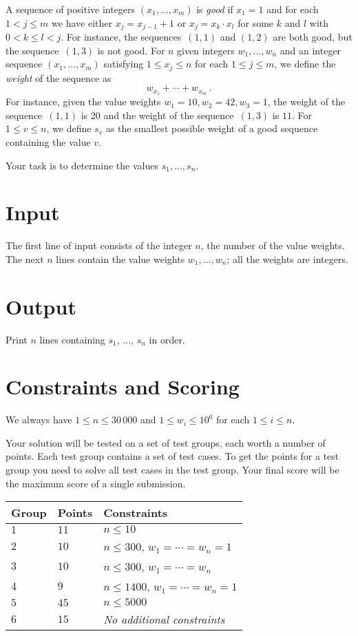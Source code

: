
\noindent
A sequence of positive integers $(x_1,\ldots,x_m)$ is \emph{good} if  $x_1 = 1$ and for each $1 < j \leq m$ we have either $x_j=x_{j-1}+1$ or $x_j=x_k\cdot x_l$ for some $k$ and $l$ with $0< k\leq l< j$.
For instance, the sequences~$(1,1)$ and $(1,2)$ are both good, but the sequence~$(1,3)$ is not good.
For  $n$ given integers $w_1,\ldots,w_n$
and an integer sequence $(x_1,\ldots,x_m)$ satisfying $1\leq x_j \leq n$ for each $1\leq j\leq m$, 
we define the \emph{weight} of the sequence as
\[ w_{x_1} +\cdots +w_{x_m}\,.\] 
For instance, given the value weights $w_1=10,  w_2=42,w_3= 1$, the weight of the sequence~$(1,1)$ is $20$ and the weight of the sequence~$(1,3)$ is $11$.
For $1\leq v\leq n$, we define $s_v$ as the smallest possible weight of a good sequence containing the value $v$.

Your task is to determine the values $s_1,\ldots ,s_n$.

\section*{Input}

The first line of input consists of the integer $n$, the number of the value weights.
The next $n$ lines contain the value weights $w_1, \ldots, w_n$; all the weights are integers.

\section*{Output}

Print $n$ lines containing $s_1$, $\ldots$, $s_n$ in order.

\section*{Constraints and Scoring}

We always have
$1\leq n \leq 30\,000$ %
and
$1\leq w_i \leq 10^6$ for each $1\leq i \leq n$.%

Your solution will be tested on a set of test groups, each worth a number of points.
Each test group contains a set of test cases.
To get the points for a test group you need to solve all test cases in the test group.
Your final score will be the maximum score of a single submission.

\medskip
\begin{tabular}{lll}
Group & Points & Constraints \\\hline
$1$   & $11$ & $n\leq 10$ \\
$2$   & $10$ & $n\leq 300$, $w_1=\cdots=w_n = 1$ \\
$3$   & $10$ & $n\leq 300$, $w_1=\cdots=w_n$ \\ %
$4$   & $9$ & $n\leq 1400$, $w_1=\cdots=w_n = 1$ \\
$5$   & $45$ & $n\leq 5000$\\
$6$   & $15$ & \emph{No additional constraints}
\end{tabular}
